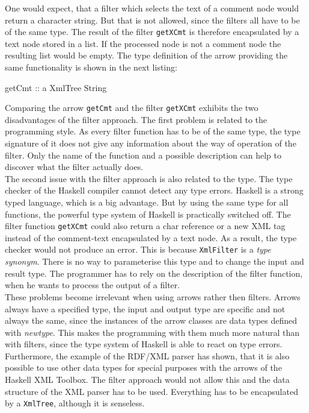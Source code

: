 \documentclass[11pt,a4paper,headsepline, bibtotoc]{scrreprt}
\begin{document}
One would expect, that a filter which selects the text of a comment node would return a character string. But that is not allowed, since the filters all have to be of the same type. The result of the filter \texttt{getXCmt} is therefore encapsulated by a text node stored in a list. If the processed node is not a comment node the resulting list would be empty. The type definition of the arrow providing the same functionality is shown in the next listing:
\begin{code}
getCmt :: a XmlTree String
\end{code}
Comparing the arrow \texttt{getCmt} and the filter \texttt{getXCmt} exhibits the two disadvantages of the filter approach. The first problem is related to the programming style. As every filter function has to be of the same type, the type signature of it does not give any information about the way of operation of the filter. Only the name of the function and a possible description can help to discover what the filter actually does.\\
The second issue with the filter approach is also related to the type. The type checker of the Haskell compiler cannot detect any type errors. Haskell is a strong typed language, which is a big advantage. But by using the same type for all functions, the powerful type system of Haskell is practically switched off. The filter function \texttt{getXCmt} could also return a char reference or a new XML tag instead of the comment-text encapsulated by a text node. As a result, the type checker would not produce an error. This is because \texttt{XmlFilter} is a \textit{type synonym}. There is no way to parameterise this type and to change the input and result type. The programmer has to rely on the description of the filter function, when he wants to process the output of a filter.\\
These problems become irrelevant when using arrows rather then filters. Arrows always have a specified type, the input and output type are specific and not always the same, since the instances of the arrow classes are data types defined with \textit{newtype}. This makes the programming with them much more natural than with filters, since the type system of Haskell is able to react on type errors. Furthermore, the example of the RDF/XML parser has shown, that it is also possible to use other data types for special purposes with the arrows of the Haskell XML Toolbox. The filter approach would not allow this and the data structure of the XML parser has to be used. Everything has to be encapsulated by a \texttt{XmlTree}, although it is senseless.\\
\end{document}
